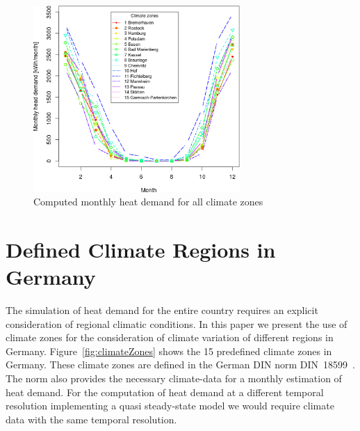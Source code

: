 \documentclass[runningheads,a4paper]{llncs}
\begin{document}
\begin{figure}
\centering
\includegraphics[width=0.7\textwidth]{FIGURES/heat.png}
\caption{Computed monthly heat demand for all climate zones}\label{fig:heat}
\end{figure}

\section{Defined Climate Regions in Germany}\label{sec:climate}

The simulation of heat demand for the entire country requires an explicit
consideration of regional climatic conditions.
In this paper we present the use of climate zones for the consideration of
climate variation of different regions in Germany.
Figure~\ref{fig:climateZones} shows the 15 predefined climate zones
in Germany.
These climate zones are defined in the German DIN norm
DIN~18599~\cite{DIN.18599.V}.
The norm also provides the necessary climate-data for a monthly estimation of
heat demand.
For the computation of heat demand at a different temporal resolution
implementing a quasi steady-state model we would require climate data with the
same temporal resolution.
\\
\end{document}
